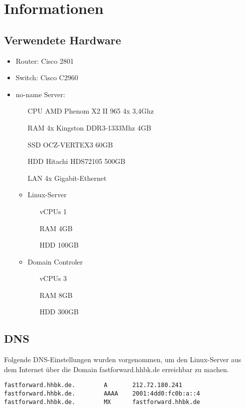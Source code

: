 \section{Informationen}

\subsection{Verwendete Hardware}

\begin{itemize}
	\item Router: Cisco 2801
	\item Switch: Cisco C2960
	\item no-name Server:
		\begin{itemize}
			\item[CPU] AMD Phenom X2 II 965 4x 3,4Ghz
			\item[RAM] 4x Kingston DDR3-1333Mhz 4GB
			\item[SSD] OCZ-VERTEX3 60GB
			\item[HDD] Hitachi HDS72105 500GB
			\item[LAN] 4x Gigabit-Ethernet
			\item Linux-Server
				\begin{itemize}
					\item[vCPUs] 1
					\item[RAM] 4GB
					\item[HDD] 100GB
				\end{itemize}
			\item Domain Controler
				\begin{itemize}
					\item[vCPUs] 3
					\item[RAM] 8GB
					\item[HDD] 300GB
				\end{itemize}
		\end{itemize}
\end{itemize}

\subsection{DNS}

Folgende DNS-Einstellungen wurden vorgenommen, um den Linux-Server aus dem Internet über die Domain {\sc fastforward.hhbk.de} erreichbar zu machen.
\begin{lstlisting}[numbers=none]
fastforward.hhbk.de.		A		212.72.180.241
fastforward.hhbk.de.		AAAA 	2001:4dd0:fc0b:a::4
fastforward.hhbk.de.		MX		fastforward.hhbk.de
\end{lstlisting}

